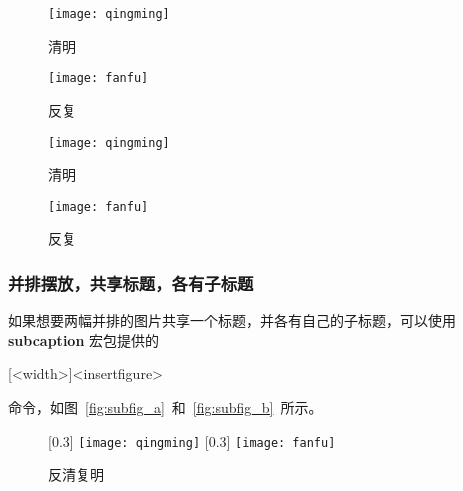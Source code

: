 \begin{latex}
\begin{figure}[htbp]
\centering
\begin{minipage}[t]{0.3\textwidth}
    \centering
    \texttt{[image: qingming]}
    \caption{清明}
    \label{fig:qingming}
\end{minipage}
\hspace{36pt}
\begin{minipage}[t]{0.3\textwidth}
    \centering
    \texttt{[image: fanfu]}
    \caption{反复}
    \label{fig:fanfu}
\end{minipage}
\end{figure}
\end{latex}

\begin{figure}[htbp]
\centering
\begin{minipage}[t]{0.3\textwidth}
    \centering
    \texttt{[image: qingming]}
    \caption{清明}
    \label{fig:qingming}
\end{minipage}
\hspace{36pt}
\begin{minipage}[t]{0.3\textwidth}
    \centering
    \texttt{[image: fanfu]}
    \caption{反复}
    \label{fig:fanfu}
\end{minipage}
\end{figure}

\subsubsection*{并排摆放，共享标题，各有子标题}

如果想要两幅并排的图片共享一个标题，并各有自己的子标题，可以使用
\textbf{subcaption} 宏包提供的
\begin{latex}
[<width>]{<insertfigure>}
\end{latex}
命令，如图~\ref{fig:subfig_a}~和~\ref{fig:subfig_b}~所示。

\begin{latex}
\begin{figure}[htbp]
  \centering
  [0.3\textwidth]{
      \texttt{[image: qingming]}
  }
  \hspace{36pt}
  [0.3\textwidth]{
      \texttt{[image: fanfu]}
  }
  \caption{反清复明}
\end{figure}
\end{latex}

